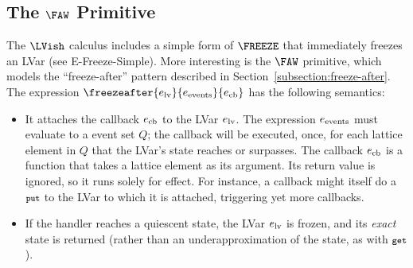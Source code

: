 \subsection{The $\FAW$ Primitive}\label{subsection:language-freezing}


The $\LVish$ calculus includes a simple form of $\FREEZE$ that immediately
freezes an LVar (see {\sc E-Freeze-Simple}).  
More interesting is the $\FAW$ primitive, which
models the ``freeze-after'' pattern described in Section~\ref{subsection:freeze-after}.
The expression $\freezeafter{e_{\rm lv}}{e_{\rm events}}{e_{\rm cb}}$ has the following semantics:
\begin{itemize}
\item It attaches the callback $e_{\rm cb}$ to the LVar $e_{\rm lv}$.  The
  expression $e_{\rm events}$ must evaluate to a event set $Q$; the callback
  will be executed, once, for each lattice element in $Q$ that the LVar's state
  reaches or surpasses.
The callback $e_{\rm cb}$ is a function that
  takes a lattice element as its argument.  Its return value is ignored, so it
  runs solely for effect.  For instance, a callback might itself do a $\mbox{\footnotesize \texttt{put}}$ to
  the LVar to which it is attached, triggering yet more callbacks.
\item If the handler reaches a quiescent state, the LVar $e_{\rm lv}$
  is frozen, and its \emph{exact} state is returned (rather than an
  underapproximation of the state, as with $\mbox{\footnotesize \texttt{get}}$).
\end{itemize}


